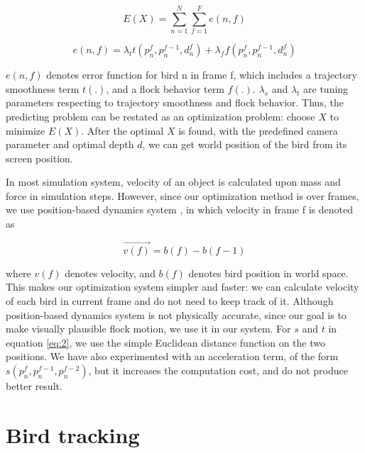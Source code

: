 \begin{equation}\label{eq:1}
 E(X) = \sum_{n = 1}^{N} \sum_{f = 1}^{F}e(n,f)
\end{equation}


\begin{equation}\label{eq:2}
 e(n,f) = \lambda_tt(p_n^f, p_n^{f-1},d_n^f) + \lambda_ff(p_n^f, p_n^{f-1},d_n^f)
\end{equation}


$e(n,f)$ denotes error function for bird n in frame f, which includes a trajectory smoothness term $t(.)$, and a flock behavior term $f(.)$. $\lambda_s$ and $\lambda_t$ are tuning parameters respecting to trajectory smoothness and flock behavior. Thus, the predicting problem can be restated as an optimization problem: choose $X$ to minimize $E(X)$. After the optimal $X$ is found, with the predefined camera parameter and optimal depth $d$, we can get world position of the bird from its screen position.


In most simulation system, velocity of an object is calculated upon mass and force in simulation steps. However, since our optimization method is over frames, we use position-based dynamics system \cite{PBD}, in which velocity in frame f is denoted as

\begin{equation}\label{eq:3}
 \vec{v(f)} = b(f)-b(f-1)
\end{equation}

where $v(f)$ denotes velocity, and $b(f)$ denotes bird position in world space. This makes our optimization system simpler and faster: we can calculate velocity of each bird in current frame and do not need to keep track of it. Although position-based dynamics system is not physically accurate, since our goal is to make visually plausible flock motion, we use it in our system.
For $s$ and $t$ in equation \ref{eq:2}, we use the simple Euclidean distance function on the two positions. We have also experimented with an acceleration term, of the form $s(p_n^f, p_n^{f-1}, p_n^{f-2})$, but it increases the computation cost, and do not produce better result.


\section{Bird tracking}


